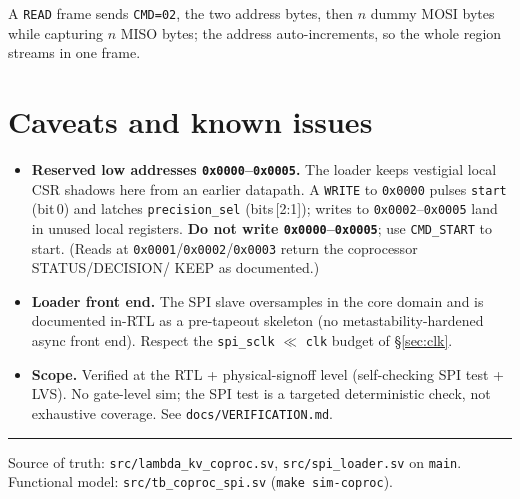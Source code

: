 \documentclass[11pt]{article}
\newcommand{\reg}[1]{\texttt{#1}}
\newcommand{\hx}[1]{\texttt{0x#1}}
\begin{document}
A \reg{READ} frame sends \reg{CMD=02}, the two address bytes, then $n$ dummy MOSI
bytes while capturing $n$ MISO bytes; the address auto-increments, so the whole
region streams in one frame.

\section{Caveats and known issues}
\begin{itemize}\setlength\itemsep{2pt}
\item \textbf{Reserved low addresses \hx{0000}--\hx{0005}.} The loader keeps
vestigial local CSR shadows here from an earlier datapath. A \reg{WRITE} to
\hx{0000} pulses \reg{start} (bit\,0) and latches \reg{precision\_sel}
(bits\,[2:1]); writes to \hx{0002}--\hx{0005} land in unused local registers.
\textbf{Do not write \hx{0000}--\hx{0005}}; use \reg{CMD\_START} to start.
(Reads at \hx{0001}/\hx{0002}/\hx{0003} return the coprocessor STATUS/DECISION/
KEEP as documented.)
\item \textbf{Loader front end.} The SPI slave oversamples in the core domain and
is documented in-RTL as a pre-tapeout skeleton (no metastability-hardened async
front end). Respect the \reg{spi\_sclk} $\ll$ \reg{clk} budget of \S\ref{sec:clk}.
\item \textbf{Scope.} Verified at the RTL + physical-signoff level (self-checking
SPI test + LVS). No gate-level sim; the SPI test is a targeted deterministic
check, not exhaustive coverage. See \reg{docs/VERIFICATION.md}.
\end{itemize}

\vspace{0.3cm}
\hrule
\vspace{0.2cm}
{\footnotesize\raggedright Source of truth: \reg{src/lambda\_kv\_coproc.sv},
\reg{src/spi\_loader.sv} on \texttt{main}. Functional model:
\reg{src/tb\_coproc\_spi.sv} (\reg{make sim-coproc}).\par}
\end{document}
